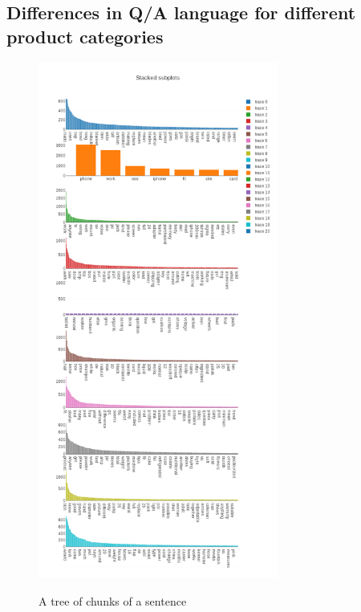 \documentclass[LaM,binding=0.6cm]{sapthesis}
\begin{document}
\subsection{Differences in Q/A language for different product categories}

\begin{figure}
\centering
\includegraphics[width=0.7\textwidth]{pictures/words0.png}\\[3ex]
\caption{A tree of chunks of a sentence}
\label{fig:chunktree}
\end{figure}
\end{document}
